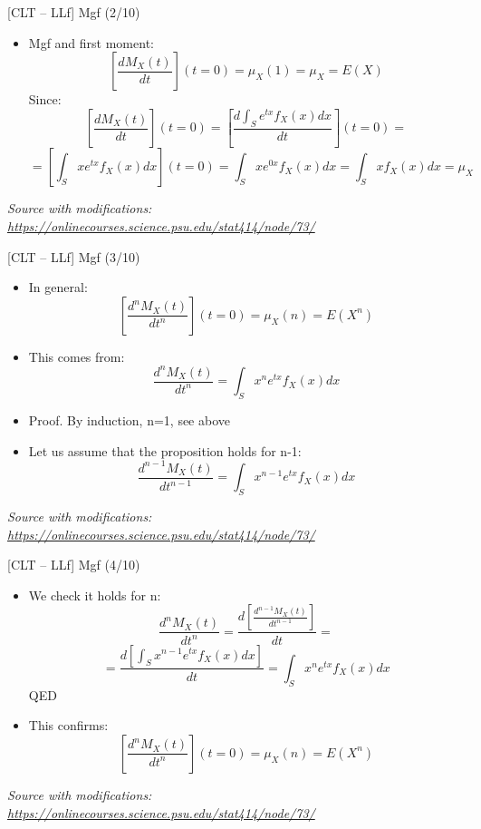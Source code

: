 \documentclass{beamer}
\begin{document}
\begin{frame}
{\centerline{[CLT -- LLf] Mgf (2/10)}}

\begin{itemize}
\item Mgf and first moment:
$$ \left [ \frac{dM_X(t)}{dt} \right ] (t=0) = \mu_X(1) = \mu_X = E(X)$$
Since:
$$ \left [ \frac{dM_X(t)}{dt} \right ] (t=0) = \left [ \frac{d\int_S e^{tx}f_X(x)dx}{dt} \right ] (t=0) = $$
$$ = \left [ \int_S xe^{tx}f_X(x)dx \right ] (t=0) = \int_S xe^{0x}f_X(x)dx=  \int_S xf_X(x)dx = \mu_X$$

\end{itemize}

\textit{\small
Source with modifications: \url{https://onlinecourses.science.psu.edu/stat414/node/73/}}
\end{frame}

\begin{frame}
{\centerline{[CLT -- LLf] Mgf (3/10)}}

\begin{itemize}
\item In general:
$$ \left [ \frac{d^nM_X(t)}{dt^n} \right ] (t=0)  = \mu_X(n) = E(X^n)$$
\item This comes from:
$$ \frac{d^nM_X(t)}{dt^n} =  \int_S x^ne^{tx}f_X(x)dx$$
\item Proof. By induction, n=1, see above
\item Let us assume that the proposition holds for n-1:
$$ \frac{d^{n-1}M_X(t)}{dt^{n-1}} =  \int_S x^{n-1}e^{tx}f_X(x)dx$$

\end{itemize}

\textit{\small
Source with modifications: \url{https://onlinecourses.science.psu.edu/stat414/node/73/}}
\end{frame}

\begin{frame}
{\centerline{[CLT -- LLf] Mgf (4/10)}}

\begin{itemize}
\item We check it holds for n:
$$ \frac{d^nM_X(t)}{dt^n} =   \frac{d \left [  \frac{d^{n-1}M_X(t)}{dt^{n-1}} \right ]}{dt} = $$
$$  =   \frac{d \left [  \int_S x^{n-1}e^{tx}f_X(x)dx \right ]}{dt} = \int_S x^ne^{tx}f_X(x)dx $$
QED
\item This confirms:
$$ \left [ \frac{d^nM_X(t)}{dt^n} \right ] (t=0)  = \mu_X(n) = E(X^n)$$

\end{itemize}
\textit{\small
Source with modifications: \url{https://onlinecourses.science.psu.edu/stat414/node/73/}}
\end{frame}
\end{document}
